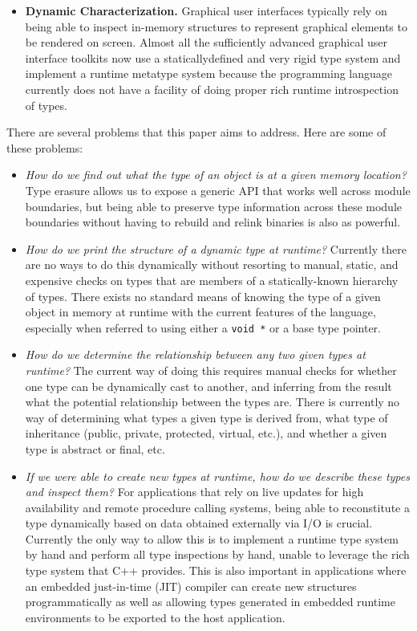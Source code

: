 \begin{itemize}
  \item \textbf{Dynamic Characterization.} Graphical user interfaces typically
  rely on being able to inspect in­-memory structures to represent graphical
  elements to be rendered on screen. Almost all the sufficiently advanced
  graphical user interface toolkits now use a statically­defined and very
  rigid type system and implement a runtime meta­type system because the
  programming language currently does not have a facility of doing proper rich
  runtime introspection of types.

\end{itemize}

There are several problems that this paper aims to address. Here are some of
these problems:

\begin{itemize}

  \item \emph{How do we find out what the type of an object is at a given
  memory location?} Type erasure allows us to expose a generic API that works
  well across module boundaries, but being able to preserve type information
  across these module boundaries without having to rebuild and relink binaries
  is also as powerful.

  \item \emph{How do we print the structure of a dynamic type at runtime?}
  Currently there are no ways to do this dynamically without resorting to
  manual, static, and expensive checks on types that are members of a
  statically-known hierarchy of types. There exists no standard means of
  knowing the type of a given object in memory at runtime with the current
  features of the language, especially when referred to using either a
  \verb+void *+ or a base type pointer.

  \item \emph{How do we determine the relationship between any two given types
  at runtime?} The current way of doing this requires manual checks for
  whether one type can be dynamically cast to another, and inferring from the
  result what the potential relationship between the types are. There is
  currently no way of determining what types a given type is derived from,
  what type of inheritance (public, private, protected, virtual, etc.), and
  whether a given type is abstract or final, etc.

  \item \emph{If we were able to create new types at runtime, how do we
  describe these types and inspect them?} For applications that rely on live
  updates for high availability and remote procedure calling systems, being
  able to reconstitute a type dynamically based on data obtained externally
  via I/O is crucial. Currently the only way to allow this is to implement a
  runtime type system by hand and perform all type inspections by hand, unable
  to leverage the rich type system that C++ provides. This is also important
  in applications where an embedded just-in-time (JIT) compiler can create new
  structures programmatically as well as allowing types generated in embedded
  runtime environments to be exported to the host application.

\end{itemize}

